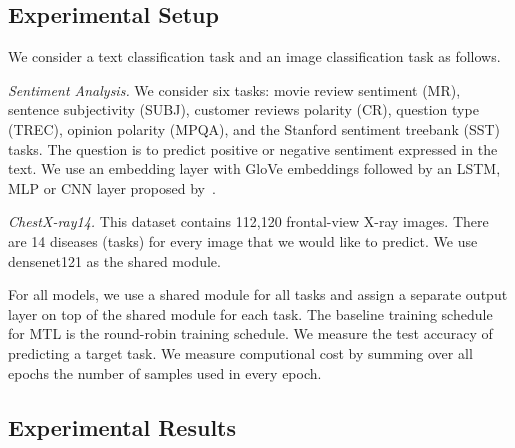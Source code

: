 \vspace{-0.07in}
\subsection{Experimental Setup}

We consider a text classification task and an image classification task as follows.

{\it Sentiment Analysis.} We consider six tasks: movie review sentiment (MR), sentence subjectivity (SUBJ), customer reviews polarity (CR), question type (TREC), opinion polarity (MPQA), and the Stanford sentiment treebank (SST) tasks.
The question is to predict positive or negative sentiment expressed in the text.
We use an embedding layer with GloVe embeddings
followed by an LSTM, MLP or CNN layer proposed by~\cite{lei2018simple}.


{\it ChestX-ray14.} This dataset contains 112,120 frontal-view X-ray images.
There are 14 diseases (tasks) for every image that we would like to predict.
We use densenet121 as the shared module.


For all models, we use a shared module for all tasks and assign a separate output layer on top of the shared module for each task.
The baseline training schedule for MTL is the round-robin training schedule.
We measure the test accuracy of predicting a target task.
We measure computional cost by summing over all epochs the number of samples used in every epoch.

\vspace{-0.07in}
\subsection{Experimental Results}\label{sec_exp_res}

